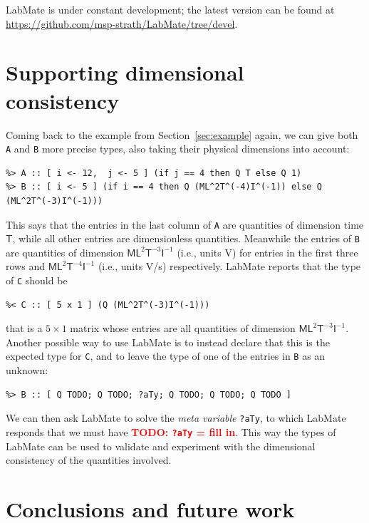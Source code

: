 \documentclass{IMEKO2024}
\newcommand{\remph}{\emph}
\newcommand{\todo}[1]{\textcolor{red}{\textbf{TODO: #1}}}
\begin{document}
LabMate is under constant development; the latest version can be found at \url{https://github.com/msp-strath/LabMate/tree/devel}.

\section{Supporting dimensional consistency}
\label{sec:example-revisited}


Coming back to the example from Section~\ref{sec:example} again, we can give both \texttt{A} and \texttt{B} more precise types, also taking their physical dimensions into account:
\begin{verbatim}
%> A :: [ i <- 12,  j <- 5 ] (if j == 4 then Q T else Q 1)
%> B :: [ i <- 5 ] (if i == 4 then Q (ML^2T^(-4)I^(-1)) else Q (ML^2T^(-3)I^(-1)))
\end{verbatim}
This says that the entries in the last column of \texttt{A} are quantities of dimension time $\mathsf{T}$, while all other entries are dimensionless quantities. Meanwhile the entries of \texttt{B} are quantities of dimension $\mathsf{ML}^{2}\mathsf{T}^{-3}\mathsf{I}^{-1}$ (i.e., units V) for entries in the first three rows and $\mathsf{ML}^{2}\mathsf{T}^{-4}\mathsf{I}^{-1}$ (i.e., units V/s) respectively. LabMate reports that the type of \texttt{C} should be
\begin{verbatim}
%< C :: [ 5 x 1 ] (Q (ML^2T^(-3)I^(-1)))
\end{verbatim}
that is a $5 \times 1$ matrix whose entries are all quantities of dimension $\mathsf{ML}^{2}\mathsf{T}^{-3}\mathsf{I}^{-1}$. Another possible way to use LabMate is to instead declare that this is the expected type for \texttt{C}, and to leave the type of one of the entries in \texttt{B} as an unknown:
\begin{verbatim}
%> B :: [ Q TODO; Q TODO; ?aTy; Q TODO; Q TODO; Q TODO ]
\end{verbatim}
We can then ask LabMate to solve the \remph{meta variable} \texttt{?aTy}, to which LabMate responds that we must have \todo{\texttt{?aTy} = fill in}. This way the types of LabMate can be used to validate and experiment with the dimensional consistency of the quantities involved.



\section{Conclusions and future work}
\end{document}
